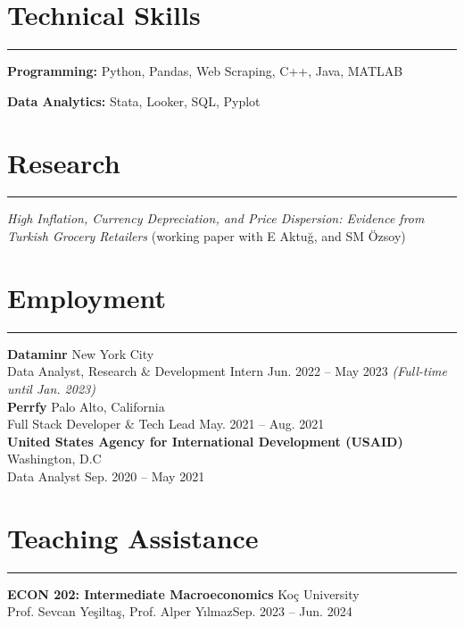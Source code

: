 \documentclass[a4paper,10pt]{article}
\newcommand{\HRule}{\rule{\linewidth}{0.5mm}}
\begin{document}
\section*{Technical Skills}
\vspace{-15pt}
\HRule

\textbf{Programming:} Python, Pandas, Web Scraping, C++, Java, MATLAB 

\textbf{Data Analytics:} Stata, Looker, SQL, Pyplot


\section*{Research}
\vspace{-15pt}
\HRule

\emph{High Inflation, Currency Depreciation, and Price Dispersion: Evidence 
from Turkish Grocery Retailers} (working paper with E Aktuğ, and SM Özsoy)


\section*{Employment}
\vspace{-15pt}
\HRule

\textbf{Dataminr} \hfill New York City\\
Data Analyst, Research $\&$ Development Intern \hfill Jun. 2022 – May 2023 \emph{(Full-time until Jan. 2023)}\\[5pt]
\vspace{-0.5pt}
\textbf{Perrfy} \hfill Palo Alto, California\\
Full Stack Developer $\&$ Tech Lead \hfill May. 2021 – Aug. 2021 \\[5pt]
\vspace{-0.5pt}
\textbf{United States Agency for International Development (USAID)} \hfill Washington, D.C\\
Data Analyst \hfill Sep. 2020 – May 2021 

\section*{Teaching Assistance}
\vspace{-15pt}
\HRule

\textbf{ECON 202: Intermediate Macroeconomics} \hfill Koç University\\
 Prof. Sevcan Yeşiltaş, Prof. Alper Yılmaz\hfill Sep. 2023 – Jun. 2024 \\[5pt]
\end{document}
